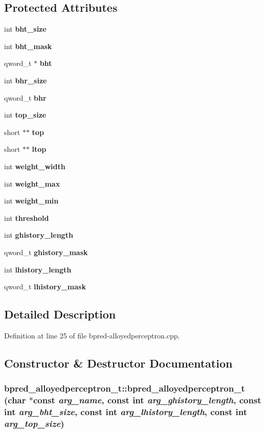 \subsection*{Protected Attributes}
\begin{CompactItemize}
\item 
int {\bf bht\_\-size}
\item 
int {\bf bht\_\-mask}
\item 
qword\_\-t $\ast$ {\bf bht}
\item 
int {\bf bhr\_\-size}
\item 
qword\_\-t {\bf bhr}
\item 
int {\bf top\_\-size}
\item 
short $\ast$$\ast$ {\bf top}
\item 
short $\ast$$\ast$ {\bf ltop}
\item 
int {\bf weight\_\-width}
\item 
int {\bf weight\_\-max}
\item 
int {\bf weight\_\-min}
\item 
int {\bf threshold}
\item 
int {\bf ghistory\_\-length}
\item 
qword\_\-t {\bf ghistory\_\-mask}
\item 
int {\bf lhistory\_\-length}
\item 
qword\_\-t {\bf lhistory\_\-mask}
\end{CompactItemize}


\subsection{Detailed Description}


Definition at line 25 of file bpred-alloyedperceptron.cpp.

\subsection{Constructor \& Destructor Documentation}
\subsubsection[{bpred\_\-alloyedperceptron\_\-t}]{\setlength{\rightskip}{0pt plus 5cm}bpred\_\-alloyedperceptron\_\-t::bpred\_\-alloyedperceptron\_\-t (char $\ast$const  {\em arg\_\-name}, \/  const int {\em arg\_\-ghistory\_\-length}, \/  const int {\em arg\_\-bht\_\-size}, \/  const int {\em arg\_\-lhistory\_\-length}, \/  const int {\em arg\_\-top\_\-size})\hspace{0.3cm}{\tt  [inline]}}\label{classbpred__alloyedperceptron__t_744d82c645e142d31a9bcd7e0eca6e66}




